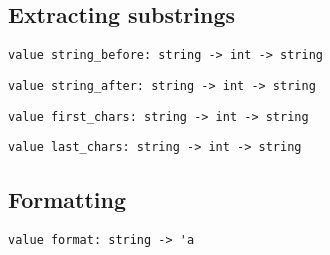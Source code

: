 \subsection*{Extracting substrings }\begin{verbatim}
value string_before: string -> int -> string
\end{verbatim}
%
\begin{comment}
 \verbstring_before s n returns the substring of all characters of \verbs
           that precede position \verbn (excluding the character at 
           position \verbn). 
\end{comment}
\begin{verbatim}
value string_after: string -> int -> string
\end{verbatim}
%
\begin{comment}
 \verbstring_after s n returns the substring of all characters of \verbs
           that follow position \verbn (including the character at 
           position \verbn). 
\end{comment}
\begin{verbatim}
value first_chars: string -> int -> string
\end{verbatim}
%
\begin{comment}
 \verbfirst_chars s n returns the first \verbn characters of \verbs.
           This is the same function as \verbstring_before. 
\end{comment}
\begin{verbatim}
value last_chars: string -> int -> string
\end{verbatim}
%
\begin{comment}
 \verblast_chars s n returns the last \verbn characters of \verbs. 
\end{comment}
\subsection*{Formatting }\begin{verbatim}
value format: string -> 'a
\end{verbatim}
%
\begin{comment}
 Same as \verbfprintf and \verbprintf from the \verbprintf module,
           except that the result of the formatting is returned as a
           string instead of being written on a channel. The structure
           of the format string is described in \verbprintf. 
\end{comment}

